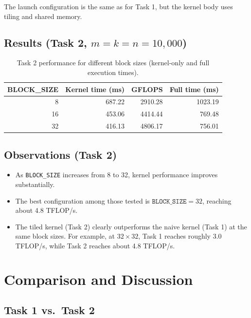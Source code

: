 \documentclass[11pt]{article}
\begin{document}
The launch configuration is the same as for Task 1, but the kernel body uses tiling and shared memory.

\subsection*{Results (Task 2, \(m = k = n = 10{,}000\))}

\begin{table}[h]
  \centering
  \begin{tabular}{|r|r|r|r|}
    \hline
    \textbf{BLOCK\_SIZE} & \textbf{Kernel time (ms)} & \textbf{GFLOPS} & \textbf{Full time (ms)} \\
    \hline
    8  & 687.22  & 2910.28 & 1023.19 \\
    16 & 453.06  & 4414.44 &  769.48 \\
    32 & 416.13  & 4806.17 &  756.01 \\
    \hline
  \end{tabular}
  \caption{Task 2 performance for different block sizes (kernel-only and full execution times).}
\end{table}

\subsection*{Observations (Task 2)}

\begin{itemize}
  \item As \texttt{BLOCK\_SIZE} increases from 8 to 32, kernel performance improves substantially.
  \item The best configuration among those tested is \(\texttt{BLOCK\_SIZE} = 32\), reaching about 4.8 TFLOP/s.
  \item The tiled kernel (Task 2) clearly outperforms the naive kernel (Task 1) at the same block sizes. For example, at \(32 \times 32\), Task 1 reaches roughly 3.0 TFLOP/s, while Task 2 reaches about 4.8 TFLOP/s.
\end{itemize}

\section{Comparison and Discussion}

\subsection*{Task 1 vs.\ Task 2}
\end{document}
